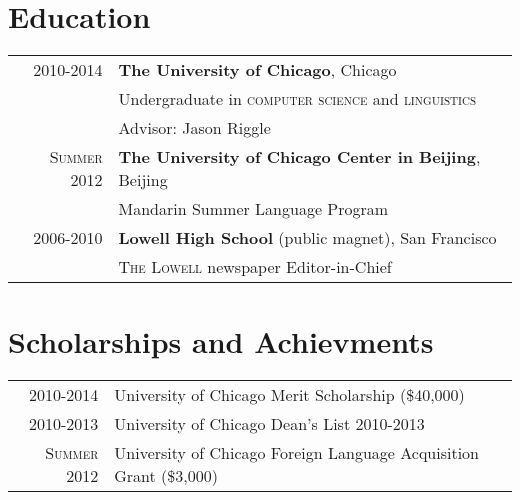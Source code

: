 \documentclass[a4paper,10pt]{article} %
\begin{document}
\section{Education}

\begin{tabular}{rl}	
\textsc{2010-2014} & \textbf{The University of Chicago}, Chicago\\
& Undergraduate in \textsc{computer science} and \textsc{linguistics} \\
& Advisor: Jason Riggle \vspace{9pt}\\


\textsc{Summer 2012} & \textbf{The University of Chicago Center in Beijing}, Beijing\\
& Mandarin Summer Language Program \vspace{9pt}\\


\textsc{2006-2010} & \textbf{Lowell High School} (public magnet), San Francisco\\
& \textsc{The Lowell} newspaper Editor-in-Chief 
\end{tabular}


\section{Scholarships and Achievments}

\begin{tabular}{rl}
\vspace{2pt}\textsc{2010-2014} & University of Chicago Merit Scholarship \footnotesize(\$40,000)\normalsize\\
\vspace{2pt}\textsc{2010-2013} & University of Chicago Dean's List 2010-2013\\
\textsc{Summer 2012} & University of Chicago Foreign Language Acquisition Grant \footnotesize(\$3,000)\normalsize\\

\end{tabular}
\end{document}
